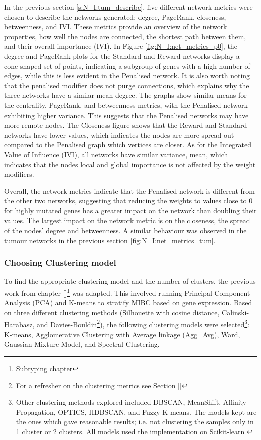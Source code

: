 In the previous section \ref{s:N_I:tum_describe}, five different network metrics were chosen to describe the networks generated: degree, PageRank, closeness, betweenness, and IVI. These metrics provide an overview of the network properties, how well the nodes are connected, the shortest path between them, and their overall importance (IVI). In Figure \ref{fig:N_I:net_metrics_p0}, the degree and PageRank plots for the Standard and Reward networks display a cone-shaped set of points, indicating a subgroup of genes with a high number of edges, while this is less evident in the Penalised network. It is also worth noting that the penalised modifier does not purge connections, which explains why the three networks have a similar mean degree. The graphs show similar means for the centrality, PageRank, and betweenness metrics, with the Penalised network exhibiting higher variance. This suggests that the Penalised networks may have more remote nodes. The Closeness figure shows that the Reward and Standard networks have lower values, which indicates the nodes are more spread out compared to the Penalised graph which vertices are closer. As for the Integrated Value of Influence (IVI), all networks have similar variance, mean, which indicates that the nodes local and global importance is not affected by the weight modifiers.

Overall, the network metrics indicate that the Penalised network is different from the other two networks, suggesting that reducing the weights to values close to 0 for highly mutated genes has a greater impact on the network than doubling their values. The largest impact on the network metric is on the closeness, the spread of the nodes' degree and betweenness. A similar behaviour was observed in the tumour networks in the previous section \cref{fig:N_I:net_metrics_tum}.


\subsubsection{Choosing Clustering model} \label{s:p0:clustering_analysis}

To find the appropriate clustering model and the number of clusters, the previous work from chapter \ref{}\footnote{Subtyping chapter} was adapted. This involved running Principal Component Analysis (PCA) and K-means to stratify MIBC based on gene expression. Based on three different clustering methods (Silhouette with cosine distance, Calinski-Harabasz, and Davies-Bouldin\footnote{For a refresher on the clustering metrics see Section \ref{}}), the following clustering models were selected\footnote{Other clustering methods explored included DBSCAN, MeanShift, Affinity Propagation, OPTICS, HDBSCAN, and Fuzzy K-means. The models kept are the ones which gave reasonable results; i.e. not clustering the samples only in 1 cluster or 2 clusters. All models used the implementation on Scikit-learn \cite{Scikit-learn_undated-ax}}: K-means, Agglomerative Clustering with Average linkage (Agg\_Avg), Ward, Gaussian Mixture Model, and Spectral Clustering.

